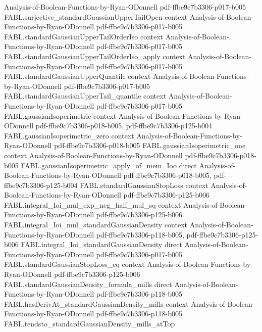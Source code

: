 \begin{theorem}
  {Analysis-of-Boolean-Functions-by-Ryan-ODonnell}
  {pdf-ffbe9c7b3306-p017-b005}
\proofstep
  {FABL.surjective_standardGaussianUpperTailOpen}
  {context}
  {Analysis-of-Boolean-Functions-by-Ryan-ODonnell}
  {pdf-ffbe9c7b3306-p017-b005}
\proofstep
  {FABL.standardGaussianUpperTailOrderIso}
  {context}
  {Analysis-of-Boolean-Functions-by-Ryan-ODonnell}
  {pdf-ffbe9c7b3306-p017-b005}
\proofstep
  {FABL.standardGaussianUpperTailOrderIso_apply}
  {context}
  {Analysis-of-Boolean-Functions-by-Ryan-ODonnell}
  {pdf-ffbe9c7b3306-p017-b005}
\proofstep
  {FABL.standardGaussianUpperQuantile}
  {context}
  {Analysis-of-Boolean-Functions-by-Ryan-ODonnell}
  {pdf-ffbe9c7b3306-p017-b005}
\proofstep
  {FABL.standardGaussianUpperTail_quantile}
  {context}
  {Analysis-of-Boolean-Functions-by-Ryan-ODonnell}
  {pdf-ffbe9c7b3306-p017-b005}
\proofstep
  {FABL.gaussianIsoperimetric}
  {context}
  {Analysis-of-Boolean-Functions-by-Ryan-ODonnell}
  {pdf-ffbe9c7b3306-p018-b005,
    pdf-ffbe9c7b3306-p125-b004}
\proofstep
  {FABL.gaussianIsoperimetric_zero}
  {context}
  {Analysis-of-Boolean-Functions-by-Ryan-ODonnell}
  {pdf-ffbe9c7b3306-p018-b005}
\proofstep
  {FABL.gaussianIsoperimetric_one}
  {context}
  {Analysis-of-Boolean-Functions-by-Ryan-ODonnell}
  {pdf-ffbe9c7b3306-p018-b005}
\proofstep
  {FABL.gaussianIsoperimetric_apply_of_mem_Ioo}
  {direct}
  {Analysis-of-Boolean-Functions-by-Ryan-ODonnell}
  {pdf-ffbe9c7b3306-p018-b005,
    pdf-ffbe9c7b3306-p125-b004}
\proofstep
  {FABL.standardGaussianStopLoss}
  {context}
  {Analysis-of-Boolean-Functions-by-Ryan-ODonnell}
  {pdf-ffbe9c7b3306-p125-b006}
\proofstep
  {FABL.integral_Ioi_mul_exp_neg_half_mul_sq}
  {context}
  {Analysis-of-Boolean-Functions-by-Ryan-ODonnell}
  {pdf-ffbe9c7b3306-p125-b006}
\proofstep
  {FABL.integral_Ioi_mul_standardGaussianDensity}
  {context}
  {Analysis-of-Boolean-Functions-by-Ryan-ODonnell}
  {pdf-ffbe9c7b3306-p118-b005,
    pdf-ffbe9c7b3306-p125-b006}
\proofstep
  {FABL.integral_Ioi_standardGaussianDensity}
  {direct}
  {Analysis-of-Boolean-Functions-by-Ryan-ODonnell}
  {pdf-ffbe9c7b3306-p017-b005}
\proofstep
  {FABL.standardGaussianStopLoss_eq}
  {context}
  {Analysis-of-Boolean-Functions-by-Ryan-ODonnell}
  {pdf-ffbe9c7b3306-p125-b006}
\proofstep
  {FABL.standardGaussianDensity_formula_mills}
  {direct}
  {Analysis-of-Boolean-Functions-by-Ryan-ODonnell}
  {pdf-ffbe9c7b3306-p118-b005}
\proofstep
  {FABL.hasDerivAt_standardGaussianDensity_mills}
  {context}
  {Analysis-of-Boolean-Functions-by-Ryan-ODonnell}
  {pdf-ffbe9c7b3306-p118-b005}
\proofstep
  {FABL.tendsto_standardGaussianDensity_mills_atTop}

\end{theorem}
